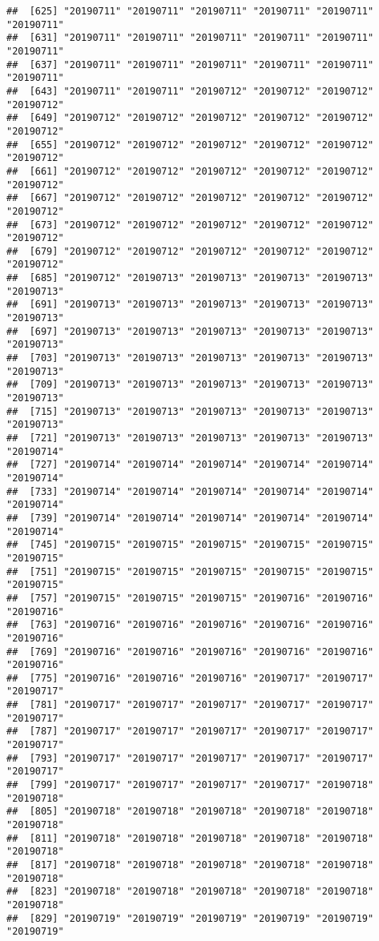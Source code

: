 \documentclass[]{article}
\begin{document}
\begin{verbatim}
##  [625] "20190711" "20190711" "20190711" "20190711" "20190711" "20190711"
##  [631] "20190711" "20190711" "20190711" "20190711" "20190711" "20190711"
##  [637] "20190711" "20190711" "20190711" "20190711" "20190711" "20190711"
##  [643] "20190711" "20190711" "20190712" "20190712" "20190712" "20190712"
##  [649] "20190712" "20190712" "20190712" "20190712" "20190712" "20190712"
##  [655] "20190712" "20190712" "20190712" "20190712" "20190712" "20190712"
##  [661] "20190712" "20190712" "20190712" "20190712" "20190712" "20190712"
##  [667] "20190712" "20190712" "20190712" "20190712" "20190712" "20190712"
##  [673] "20190712" "20190712" "20190712" "20190712" "20190712" "20190712"
##  [679] "20190712" "20190712" "20190712" "20190712" "20190712" "20190712"
##  [685] "20190712" "20190713" "20190713" "20190713" "20190713" "20190713"
##  [691] "20190713" "20190713" "20190713" "20190713" "20190713" "20190713"
##  [697] "20190713" "20190713" "20190713" "20190713" "20190713" "20190713"
##  [703] "20190713" "20190713" "20190713" "20190713" "20190713" "20190713"
##  [709] "20190713" "20190713" "20190713" "20190713" "20190713" "20190713"
##  [715] "20190713" "20190713" "20190713" "20190713" "20190713" "20190713"
##  [721] "20190713" "20190713" "20190713" "20190713" "20190713" "20190714"
##  [727] "20190714" "20190714" "20190714" "20190714" "20190714" "20190714"
##  [733] "20190714" "20190714" "20190714" "20190714" "20190714" "20190714"
##  [739] "20190714" "20190714" "20190714" "20190714" "20190714" "20190714"
##  [745] "20190715" "20190715" "20190715" "20190715" "20190715" "20190715"
##  [751] "20190715" "20190715" "20190715" "20190715" "20190715" "20190715"
##  [757] "20190715" "20190715" "20190715" "20190716" "20190716" "20190716"
##  [763] "20190716" "20190716" "20190716" "20190716" "20190716" "20190716"
##  [769] "20190716" "20190716" "20190716" "20190716" "20190716" "20190716"
##  [775] "20190716" "20190716" "20190716" "20190717" "20190717" "20190717"
##  [781] "20190717" "20190717" "20190717" "20190717" "20190717" "20190717"
##  [787] "20190717" "20190717" "20190717" "20190717" "20190717" "20190717"
##  [793] "20190717" "20190717" "20190717" "20190717" "20190717" "20190717"
##  [799] "20190717" "20190717" "20190717" "20190717" "20190718" "20190718"
##  [805] "20190718" "20190718" "20190718" "20190718" "20190718" "20190718"
##  [811] "20190718" "20190718" "20190718" "20190718" "20190718" "20190718"
##  [817] "20190718" "20190718" "20190718" "20190718" "20190718" "20190718"
##  [823] "20190718" "20190718" "20190718" "20190718" "20190718" "20190718"
##  [829] "20190719" "20190719" "20190719" "20190719" "20190719" "20190719"

\end{verbatim}
\end{document}

